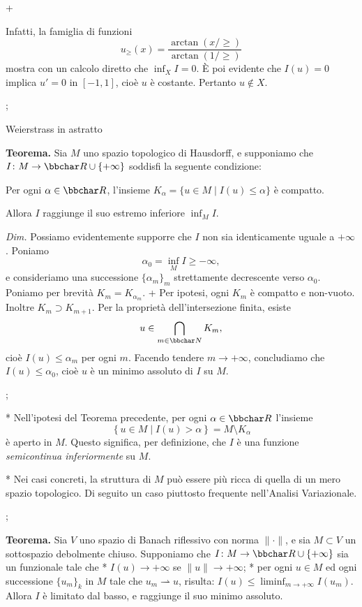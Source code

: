 \pg+

Infatti, la famiglia di funzioni
$$
u_\ge (x) = \frac{\arctan(x/\ge)}{\arctan(1/\ge)}
$$
mostra con un calcolo diretto che $\inf_X I=0$. \`E poi evidente che
$I(u)=0$ implica $u'=0$ in $[-1,1]$, cio\`e $u$ \`e costante. Pertanto
$u \notin X$.

\pg;

\sec Weierstrass in astratto

{\bf Teorema.} Sia $M$ uno spazio topologico di Hausdorff, e
supponiamo che $I \colon M \to \R \cup \{+\infty\}$ soddisfi la
seguente condizione:

\smallskip

Per ogni $\alpha \in \R$, l'insieme $K_\alpha = \{ u \in M \mid I(u)
\leq \alpha \}$ \`e compatto.

\smallskip

Allora $I$ raggiunge il suo estremo inferiore $\inf_M I$.

\medskip

{\em Dim.} Possiamo evidentemente supporre che $I$ non sia
identicamente uguale a $+\infty$. Poniamo
$$
\alpha_0 = \inf_M I \geq -\infty,
$$
e consideriamo una successione $\{\alpha_m\}_m$ strettamente
decrescente verso $\alpha_0$. Poniamo per brevit\`a
$K_m=K_{\alpha_m}$.
\pg+
Per ipotesi, ogni $K_m$ \`e compatto e non-vuoto. Inoltre $K_m \supset
K_{m+1}$. Per la propriet\`a dell'intersezione finita, esiste
$$
u \in \bigcap_{m \in {\bbchar N}} K_m,
$$
cio\`e $I(u) \leq \alpha_m$ per ogni $m$. Facendo tendere $m \to
+\infty$, concludiamo che $I(u) \leq \alpha_0$, cio\`e $u$ \`e un
minimo assoluto di $I$ su $M$.

\pg;

* Nell'ipotesi del Teorema precedente, per ogni $\alpha \in \R$
  l'insieme
  $$
  \left\{ u \in M \mid I(u) > \alpha \right\} = M \setminus K_\alpha
  $$
  \`e aperto in $M$. Questo significa, per definizione, che $I$ \`e
  una funzione {\em semicontinua inferiormente} su $M$.

* Nei casi concreti, la struttura di $M$ pu\`o essere pi\`u ricca di
  quella di un mero spazio topologico. Di seguito un caso piuttosto
  frequente nell'Analisi Variazionale.

\pg;

{\bf Teorema.} Sia $V$ uno spazio di Banach riflessivo con norma $\|
\cdot \|$, e sia $M \subset V$ un sottospazio debolmente
chiuso. Supponiamo che $I \colon M \to \R \cup \{+\infty\}$ sia un
funzionale tale che
\begitems
* $I(u) \to +\infty$ se $\|u\| \to +\infty$;
* per ogni $u \in M$ ed ogni successione $\{u_m\}_k$ in $M$ tale che
$u_m \rightharpoonup u$, risulta: $I(u) \leq \liminf_{m \to +\infty}
I(u_m)$.
\enditems
Allora $I$ \`e limitato dal basso, e raggiunge il suo minimo assoluto.

